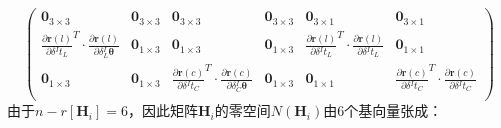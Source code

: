 \begin{equation*}
\begin{pmatrix}
    \boldsymbol{0}_{3\times 3}                                                             &
    \boldsymbol{0}_{3\times 3}                                                             &
    \boldsymbol{0}_{3\times 3}                                                             &
    \boldsymbol{0}_{3\times 3}                                                             &
    \boldsymbol{0}_{3\times 1}                                                             &
    \boldsymbol{0}_{3\times 1}                                                               \\
    \frac{\partial \boldsymbol{r}(l)}{\partial \delta {^{I}t_{L}}}^T
    \cdot\frac{\partial \boldsymbol{r}(l)}{\partial \delta {^{I}_{L}\boldsymbol{\theta}}}  &
    \boldsymbol{0}_{1\times 3}                                                             &
    \boldsymbol{0}_{1\times 3}                                                             &
    \boldsymbol{0}_{1\times 3}                                                             &
    \frac{\partial \boldsymbol{r}(l)}{\partial \delta {^{I}t_{L}}}^T
    \cdot\frac{\partial \boldsymbol{r}(l)}{\partial \delta {^{I}t_{L}}}                    &
    \boldsymbol{0}_{1\times 1}                                                               \\
    \boldsymbol{0}_{1\times 3}                                                             &
    \boldsymbol{0}_{1\times 3}                                                             &
    \frac{\partial \boldsymbol{r}(c)}{\partial \delta {^{I}t_{C}}}^T
    \cdot\frac{\partial \boldsymbol{r}(c)}{\partial \delta {^{I}_{C}\boldsymbol{\theta}}}  &
    \boldsymbol{0}_{1\times 3}                                                             &
    \boldsymbol{0}_{1\times 1}                                                             &
    \frac{\partial \boldsymbol{r}(c)}{\partial \delta {^{I}t_{C}}}^T
    \cdot\frac{\partial \boldsymbol{r}(c)}{\partial \delta {^{I}t_{C}}}                      \\
  \end{pmatrix}
\end{equation*}
由于$n-r\left[ \boldsymbol{H}_i\right] =6$，因此矩阵$\boldsymbol{H}_i$的零空间$N(\boldsymbol{H}_i)$由6个基向量张成：
